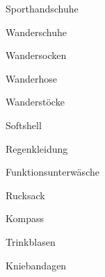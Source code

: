 

\begin{VIERitemize}
    \item{Sporthandschuhe}
    \item{Wanderschuhe}
    \item{Wandersocken}
    \item{Wanderhose}
    \item{Wanderstöcke}
    \item{Softshell}
    \item{Regenkleidung}
    \item{Funktionsunterwäsche}
    \item{Rucksack}
\end{VIERitemize}

\begin{ONEitemize}
    \item{Kompass}
    \item{Trinkblasen}
    \item{Kniebandagen}
\end{ONEitemize}
 